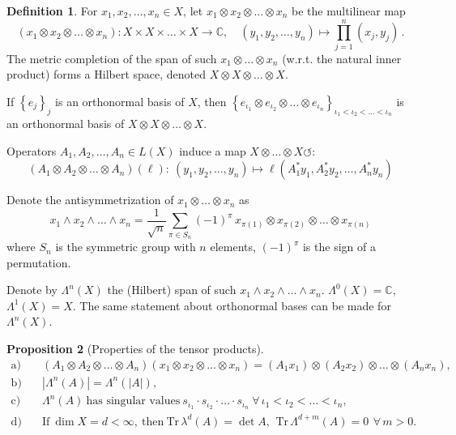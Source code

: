 \documentclass[a4paper, 10pt]{article}
\newcommand{\Tr}{\textrm{Tr}\,}
\newcommand{\bbC}{\mathbb{C}}
\theoremstyle{definition}
\newtheorem{definition}{Definition}[section]
\newtheorem{proposition}[definition]{Proposition}
\theoremstyle{remark}
\theoremstyle{remark}
\begin{document}
\begin{definition}
    For $x_1, x_2, \ldots, x_n \in X$, let $x_1 \otimes x_2 \otimes \ldots \otimes x_n$ be the multilinear map 
    \begin{equation}
        (x_1 \otimes x_2 \otimes \ldots \otimes x_n) : X \times X \times \ldots \times X \to \bbC, \quad (y_1, y_2, \ldots, y_n) \mapsto \prod_{j=1}^{n} (x_j, y_j) \,. 
    \end{equation}
    The metric completion of the span of such $x_1 \otimes \ldots \otimes x_n$ (w.r.t. the natural inner product) forms a Hilbert space, denoted $X \otimes X \otimes \ldots \otimes X$. 

    If $\left\{ e_j \right\}_j$ is an orthonormal basis of $X$, then $\left\{ e_{\iota_1} \otimes e_{\iota_2} \otimes \ldots \otimes e_{\iota_n} \right\}_{\iota_1 < \iota_2 < \ldots < \iota_n}$ is an orthonormal basis of $X \otimes X \otimes \ldots \otimes X$. 

    Operators $A_1, A_2, \ldots, A_n \in L(X)$ induce a map $X \otimes \ldots \otimes X \circlearrowleft$: 
    \begin{equation}
        (A_1 \otimes A_2 \otimes \ldots \otimes A_n)(\ell) :\  (y_1, y_2, \ldots, y_n) \mapsto \ell (A_1^* y_1, A_2^* y_2, \ldots, A_n^* y_n)
    \end{equation}

    Denote the antisymmetrization of $x_1 \otimes \ldots \otimes x_n$ as 
    \begin{equation}
        x_1 \wedge x_2 \wedge \ldots \wedge x_n = \frac{1}{\sqrt{n}}  \sum_{\pi \in S_n} (-1)^\pi\, x_{\pi (1)} \otimes x_{\pi (2)} \otimes \ldots \otimes x_{\pi (n)} 
    \end{equation}
    where $S_n$ is the symmetric group with $n$ elements, $(-1)^\pi$ is the sign of a permutation. 

    Denote by $\Lambda^n (X)$ the (Hilbert) span of such $x_1 \wedge x_2 \wedge \ldots \wedge x_n$. $\Lambda^0 (X) = \bbC$, $\Lambda^1 (X) = X$. The same statement about orthonormal bases can be made for $\Lambda^n (X)$. 
\end{definition}

\begin{proposition}[Properties of the tensor products] 
    \begin{align}
        \text{a)} &\quad (A_1 \otimes A_2 \otimes \ldots \otimes A_n) (x_1 \otimes x_2 \otimes \ldots \otimes x_n) = (A_1 x_1) \otimes (A_2 x_2) \otimes \ldots \otimes (A_n x_n), \\
        \text{b)} &\quad | \Lambda^n (A) | = \Lambda^n (|A|), \\
        \text{c)} &\quad \Lambda^n (A)\ \text{has singular values}\ s_{\iota_1} \cdot s_{\iota_2} \cdot \ldots \cdot s_{\iota_n}\ \forall\, \iota_1 < \iota_2 < \ldots < \iota_n, \\
        \text{d)} &\quad \text{If}\ \dim X = d < \infty,\ \text{then}\ \Tr \lambda^d (A) = \det A,\,\ \Tr \Lambda^{d+m} (A) = 0\,\ \forall\, m > 0. 
    \end{align}

\end{proposition}
\end{document}
